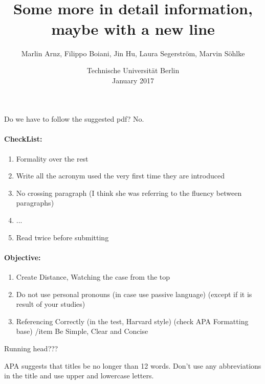 \documentclass[10pt,twoside,twocolumn,notitle,a4paper]{IEEEtran}
\title{\TITLES  \\
	\large Some more in detail information, \\
	maybe with a new line}
\author{Marlin Arnz, Filippo Boiani, Jin Hu, Laura Segerström, Marvin Söhlke}
\date{ Technische Universität Berlin \\ January 2017}
\newenvironment{notation}{%
   \def\FrameCommand{\colorbox{yellow!20}}%
   \MakeFramed{\advance\hsize-\width \FrameRestore}}
 {\endMakeFramed}
\newenvironment{question}{%
   \def\FrameCommand{\colorbox{red!20}}%
   \MakeFramed{\advance\hsize-\width \FrameRestore}}
 {\endMakeFramed}
\newenvironment{answer}{%
   \def\FrameCommand{\colorbox{green!20}}%
   \MakeFramed{\advance\hsize-\width \FrameRestore}}
 {\endMakeFramed}
\begin{document}
\maketitle


\thispagestyle{fancy}

\begin{question}
Do we have to follow the suggested pdf?
\end{question}
\begin{answer}
No.
\end{answer}


\begin{notation}

\paragraph{CheckList:}
\begin{enumerate}
\item Formality over the rest
\item Write all the acronym used the very first time they are introduced
\item No crossing paragraph (I think she was referring to the fluency between paragraphs)
\item ...
\item Read twice before submitting
\end{enumerate}

\paragraph{Objective:}
\begin{enumerate}
\item Create Distance, Watching the case from the top
\item Do not use personal pronouns (in case use passive language) (except if it is result of your studies)
\item Referencing Correctly (in the test, Harvard style) (check APA Formatting base)
/item Be Simple, Clear and Concise
\end{enumerate}

\end{notation}

\begin{question}
Running head???
\end{question}

\begin{notation}
	APA suggests that titles be no longer than 12 words. Don’t use any abbreviations in the title and use upper and lowercase letters.
	\end{notation}
\end{document}
